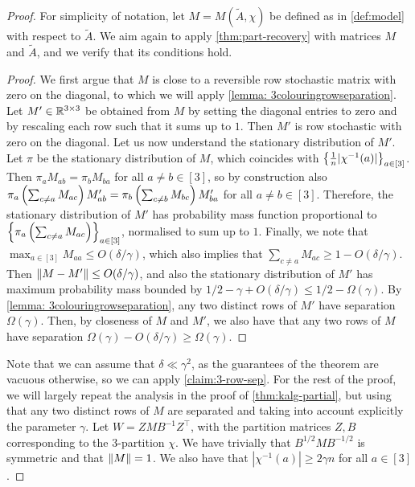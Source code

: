 \begin{proof}
For simplicity of notation, let $M = M(\tilde{A}, \chi)$ be defined as in \cref{def:model} with respect to $\tilde{A}$.
We aim again to apply \cref{thm:part-recovery} with matrices $M$ and $\tilde{A}$, and we verify that its conditions hold.

\begin{proof}
We first argue that $M$ is close to a reversible row stochastic matrix with zero on the diagonal, to which we will apply \cref{lemma: 3colouringrowseparation}.
Let $M' \in {\mathbb R}^{3 \times 3}$ be obtained from $M$ by setting the diagonal entries to zero and by rescaling each row such that it sums up to $1$.
Then $M'$ is row stochastic with zero on the diagonal.
Let us now understand the stationary distribution of $M'$.
Let $\pi$ be the stationary distribution of $M$, which coincides with $\left\{\frac{1}{n} |\chi^{-1}(a)|\right\}_{a \in [3]}$.
Then $\pi_{a} M_{ab} = \pi_b M_{ba}$ for all $a \neq b \in [3]$, so by construction also $\pi_a \left(\sum_{c \neq a} M_{ac}\right) M'_{ab} = \pi_b \left(\sum_{c \neq b} M_{bc}\right) M'_{ba}$ for all $a \neq b \in [3]$.
Therefore, the stationary distribution of $M'$ has probability mass function proportional to $\left\{\pi_a \left(\sum_{c \neq a} M_{ac}\right)\right\}_{a \in [3]}$, normalised to sum up to $1$.
Finally, we note that $\max_{a \in [3]} M_{aa} \leq O(\delta / \gamma)$, which also implies that $\sum_{c \neq a} M_{ac} \geq 1 - O(\delta / \gamma)$.
Then $\left\lVert M - M'\right\rVert \leq O(\delta / \gamma)$, and also the stationary distribution of $M'$ has maximum probability mass bounded by $1/2 - \gamma + O(\delta/\gamma) \leq 1/2 - \Omega(\gamma)$.
By \cref{lemma: 3colouringrowseparation}, any two distinct rows of $M'$ have separation $\Omega(\gamma)$.
Then, by closeness of $M$ and $M'$, we also have that any two rows of $M$ have separation $\Omega(\gamma) - O(\delta/\gamma) \geq \Omega(\gamma)$.
\end{proof}

Note that we can assume that $\delta \ll \gamma^2$, as the guarantees of the theorem are vacuous otherwise, so we can apply \cref{claim:3-row-sep}.
For the rest of the proof, we will largely repeat the analysis in the proof of \cref{thm:kalg-partial}, but using that any two distinct rows of $M$ are separated and taking into account explicitly the parameter $\gamma$.
Let $W = Z M B^{-1} Z^\top$, with the partition matrices $Z, B$ corresponding to the $3$-partition $\chi$.
We have trivially that $B^{1/2} M B^{-1/2}$ is symmetric and that $\left\lVert M\right\rVert = 1$.
We also have that $|\chi^{-1}(a)| \geq 2\gamma n$ for all $a \in [3]$.


\end{proof}
